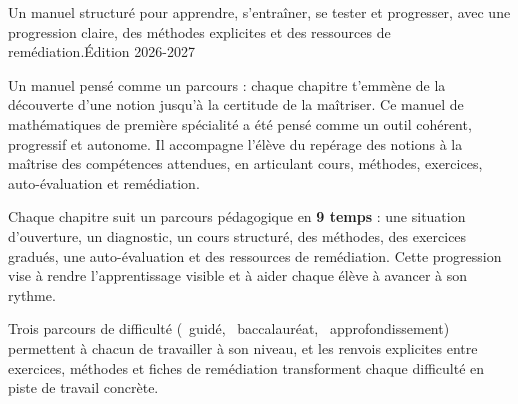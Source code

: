 \documentclass{gabarits/nexus-manuel-v5}
\begin{document}
%
  {Un manuel structuré pour apprendre, s'entraîner, se tester et progresser,
   avec une progression claire, des méthodes explicites et des ressources de
   remédiation.}{Édition 2026-2027}

\begin{avantproposNexus}{Un manuel pensé comme un parcours : chaque chapitre
  t'emmène de la découverte d'une notion jusqu'à la certitude de la maîtriser.}
Ce manuel de mathématiques de première spécialité a été pensé comme un outil
cohérent, progressif et autonome. Il accompagne l'élève du repérage des
notions à la maîtrise des compétences attendues, en articulant cours,
méthodes, exercices, auto-évaluation et remédiation.

Chaque chapitre suit un parcours pédagogique en \textbf{9 temps} : une
situation d'ouverture, un diagnostic, un cours structuré, des méthodes, des
exercices gradués, une auto-évaluation et des ressources de remédiation.
Cette progression vise à rendre l'apprentissage visible et à aider chaque
élève à avancer à son rythme.

Trois parcours de difficulté (\parcoursUn~guidé, \parcoursDeux~baccalauréat,
\parcoursTrois~approfondissement) permettent à chacun de travailler à son
niveau, et les renvois explicites entre exercices, méthodes et fiches de
remédiation transforment chaque difficulté en piste de travail concrète.
\end{avantproposNexus}
\end{document}
